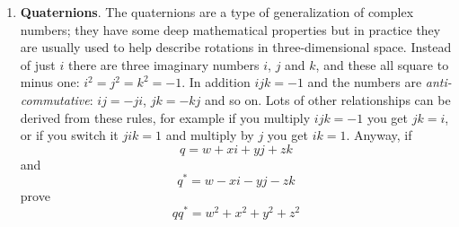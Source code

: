 \documentclass[11pt,a4paper]{scrartcl}
\begin{document}
\begin{enumerate}
\item \textbf{Quaternions}. The quaternions are a type of generalization of complex numbers; they have some deep mathematical properties but in practice they are usually used to help describe rotations in three-dimensional space. Instead of just $i$ there are three imaginary numbers $i$, $j$ and $k$, and these all square to minus one: $i^2=j^2=k^2=-1$. In addition $ijk=-1$ and the numbers are \textsl{anti-commutative}: $ij=-ji$, $jk=-kj$ and so on. Lots of other relationships can be derived from these rules, for example if you multiply $ijk=-1$ you get $jk=i$, or if you switch it $jik=1$ and multiply by $j$ you get $ik=1$. Anyway, if
  \begin{equation}
    q=w+xi+yj+zk
  \end{equation}
  and
  \begin{equation}
    q^*=w-xi-yj-zk
  \end{equation}
  prove
  \begin{equation}
    qq^*=w^2+x^2+y^2+z^2
  \end{equation}
  
        
\end{enumerate}
\end{document}
